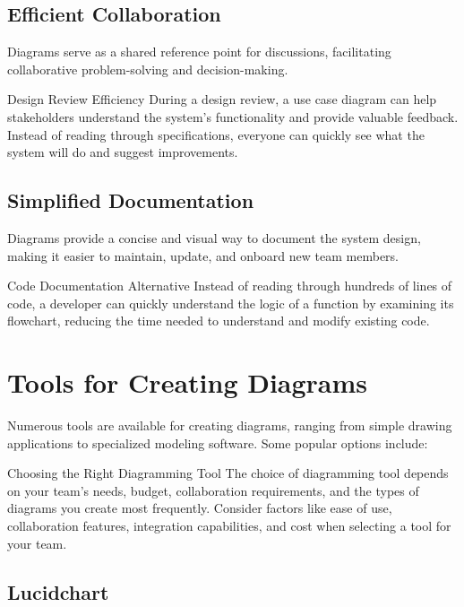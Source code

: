 \subsection{Efficient Collaboration}

Diagrams serve as a shared reference point for discussions, facilitating collaborative problem-solving and decision-making.

\begin{examplecard}{Design Review Efficiency}
  During a design review, a use case diagram can help stakeholders understand the system's functionality and provide valuable feedback. Instead of reading through specifications, everyone can quickly see what the system will do and suggest improvements.
\end{examplecard}

\subsection{Simplified Documentation}

Diagrams provide a concise and visual way to document the system design, making it easier to maintain, update, and onboard new team members.

\begin{examplecard}{Code Documentation Alternative}
  Instead of reading through hundreds of lines of code, a developer can quickly understand the logic of a function by examining its flowchart, reducing the time needed to understand and modify existing code.
\end{examplecard}

\section{Tools for Creating Diagrams}

Numerous tools are available for creating diagrams, ranging from simple drawing applications to specialized modeling software. Some popular options include:

\begin{conceptcard}{Choosing the Right Diagramming Tool}
  The choice of diagramming tool depends on your team's needs, budget, collaboration requirements, and the types of diagrams you create most frequently. Consider factors like ease of use, collaboration features, integration capabilities, and cost when selecting a tool for your team.
\end{conceptcard}

\subsection{Lucidchart}

